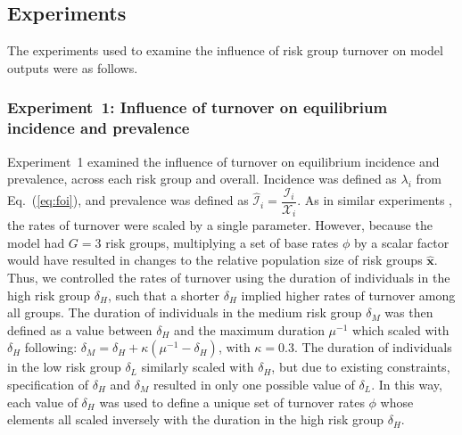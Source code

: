\subsection{Experiments}
\label{ss:exp}
The experiments used to examine
the influence of risk group turnover on model outputs
were as follows.
\subsubsection{Experiment~1: Influence of turnover on equilibrium incidence and prevalence}
\label{sss:exp-prev-inc}
Experiment~1 examined the influence of turnover on
equilibrium incidence and prevalence, across each risk group and overall.
Incidence was defined as $\lambda_i$ from Eq.~(\ref{eq:foi}), and
prevalence was defined as $\hat{\mathcal{I}}_i = \dfrac{\mathcal{I}_i}{\mathcal{X}_i}$.
As in similar experiments \citep{Zhang2012,Henry2015},
the rates of turnover were scaled by a single parameter.
However, because the model had $G = 3$ risk groups,
multiplying a set of base rates $\phi$ by a scalar factor
would have resulted in changes to the relative population size of risk groups $\bm{\hat{x}}$.
Thus, we controlled the rates of turnover using
the duration of individuals in the high risk group $\delta_H$,
such that a shorter $\delta_H$ implied higher rates of turnover among all groups.
The duration of individuals in the medium risk group $\delta_M$
was then defined as a value between $\delta_H$ and the maximum duration $\mu^{-1}$
which scaled with $\delta_H$ following:
$\delta_M = \delta_H + \kappa \left(\mu^{-1} - \delta_H\right)$, with $\kappa = 0.3$.
The duration of individuals in the low risk group $\delta_L$
similarly scaled with $\delta_H$,
but due to existing constraints,
specification of $\delta_H$ and $\delta_M$
resulted in only one possible value of $\delta_L$.
In this way, each value of $\delta_H$ was used to define a unique set of turnover rates $\phi$
whose elements all scaled inversely with the duration in the high risk group $\delta_H$.
